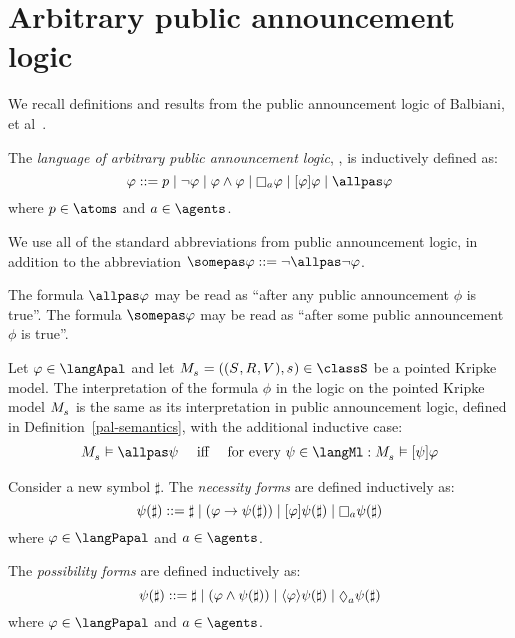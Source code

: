 \section{Arbitrary public announcement logic}\label{apal}

We recall definitions and results from the public announcement logic of Balbiani, et al~\cite{balbiani:2008}.

\begin{definition}
The {\em language of arbitrary public announcement logic}, \langApal{}, is inductively defined as:
$$
\phi ::= 
    \atomP \mid
    \lnot \phi \mid
    \phi \land \phi \mid
    \necessaryA \phi \mid
    \announceA{\phi} \phi \mid
    \allpas \phi
$$
where $\atomP \in \atoms$ and $\agentA \in \agents$.
\end{definition}

We use all of the standard abbreviations from public announcement logic, in addition to the abbreviation $\somepas \phi ::= \lnot \allpas \lnot \phi$.

The formula $\allpas \phi$ may be read as ``after any public announcement $\phi$ is true''.
The formula $\somepas \phi$ may be read as ``after some public announcement $\phi$ is true''.

\begin{definition}
Let $\phi \in \langApal$ and let $\kPModelAndTuple{\kStateS} \in \classS$ be a pointed Kripke model.
The interpretation of the formula $\phi$ in the logic \logicApalS{} on the pointed Kripke model $\kPModel{\kStateS}$ is the same as its interpretation in public announcement logic, defined in Definition~\ref{pal-semantics}, with the additional inductive case:
$$
\begin{array}{lcl}
    \kPModel{\kStateS} \entails \allpas \psi & \text{ iff } & \text{for every } \psi \in \langMl : \kPModel{\kStateS} \entails \announceA{\psi} \phi
\end{array}
$$
\end{definition}

\begin{definition}
Consider a new symbol $\sharp$. The {\em necessity forms} are defined inductively as:
$$\psi(\sharp) ::= \sharp \mid (\phi \implies \psi(\sharp)) \mid \announceA{\phi} \psi(\sharp) \mid \knows[\agentA] \psi(\sharp)$$
where $\phi \in \langPapal$ and $\agentA \in \agents$.

The {\em possibility forms} are defined inductively as:
$$\psi(\sharp) ::= \sharp \mid (\phi \land \psi(\sharp)) \mid \announceE{\phi} \psi(\sharp) \mid \suspects[\agentA] \psi(\sharp)$$
where $\phi \in \langPapal$ and $\agentA \in \agents$.
\end{definition}


